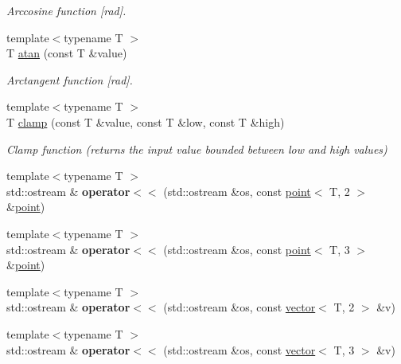 \begin{DoxyCompactItemize}
\begin{DoxyCompactList}\small\item\em Arccosine function \mbox{[}rad\mbox{]}. \end{DoxyCompactList}\item 
{\footnotesize template$<$typename T $>$ }\\T \hyperlink{namespaceacme_ab9d8ecb26b9bc01ea9e8906489d709bf}{atan} (const T \&value)
\begin{DoxyCompactList}\small\item\em Arctangent function \mbox{[}rad\mbox{]}. \end{DoxyCompactList}\item 
{\footnotesize template$<$typename T $>$ }\\T \hyperlink{namespaceacme_a51ac298ca5ccfff9b9d71bfed9253131}{clamp} (const T \&value, const T \&low, const T \&high)
\begin{DoxyCompactList}\small\item\em Clamp function (returns the input value bounded between low and high values) \end{DoxyCompactList}\item 
\mbox{\label{namespaceacme_a2c79447f606dfc6a46352dcf4ab6a226}} 
{\footnotesize template$<$typename T $>$ }\\std\+::ostream \& {\bfseries operator$<$$<$} (std\+::ostream \&os, const \hyperlink{classacme_1_1point}{point}$<$ T, 2 $>$ \&\hyperlink{classacme_1_1point}{point})
\item 
\mbox{\label{namespaceacme_af9cd10051c731a63bde1491f363fa627}} 
{\footnotesize template$<$typename T $>$ }\\std\+::ostream \& {\bfseries operator$<$$<$} (std\+::ostream \&os, const \hyperlink{classacme_1_1point}{point}$<$ T, 3 $>$ \&\hyperlink{classacme_1_1point}{point})
\item 
\mbox{\label{namespaceacme_a247502a3b4f8bd373a9b38411f0f9ee4}} 
{\footnotesize template$<$typename T $>$ }\\std\+::ostream \& {\bfseries operator$<$$<$} (std\+::ostream \&os, const \hyperlink{classacme_1_1vector}{vector}$<$ T, 2 $>$ \&v)
\item 
\mbox{\label{namespaceacme_a9def3b70c1e053fb3c935a8870897fc0}} 
{\footnotesize template$<$typename T $>$ }\\std\+::ostream \& {\bfseries operator$<$$<$} (std\+::ostream \&os, const \hyperlink{classacme_1_1vector}{vector}$<$ T, 3 $>$ \&v)

\end{DoxyCompactItemize}
